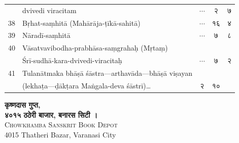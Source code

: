 \documentclass[11pt,a4paper]{article}
\newcommand{\dev}[1]{{\devanagarifont #1}}
\begin{document}
\begin{longtable}{r p{8cm} c c}
   & dvivedi viracitam & $\cdots$ & २ & ७ \\
38 & Bṛhat-saṃhitā (Mahārāja-ṭīkā-sahitā) & $\cdots$ & १६ & ४ \\
39 & Nāradī-saṃhitā & $\cdots$ & ७ & ८ \\
40 & Vāsatvavibodha-prabhāsa-saṃgrahaḥ (Mṛtaṃ)\\
   & Śrī-sudhā-kara-dvivedi-viracitaḥ & $\cdots$ & ७ & २ \\
41 & Tulanātmaka bhāṣā śāstra—arthavāda—bhāṣā viṣayan\\
   & (lekhaṭa—ḍākṭara Maṅgala-deva śāstrī)\ldots & २ & १० \\
\bottomrule
\end{longtable}

\vfill
\begin{center}
\textbf{\dev{कृष्णदास गुप्त,}}\\
\textbf{\dev{४०१५ ठठेरी बाजार, बनारस सिटी ।}}\\[0.5em]
\textsc{Chowkhamba Sanskrit Book Depot}\\
4015 Thatheri Bazar, Varanasi City
\end{center}

\end{document}
